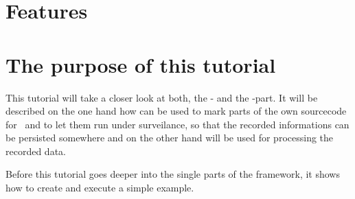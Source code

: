 \section{Features}
	
\section{The purpose of this tutorial}
This tutorial will take a closer look at both, the \KiekerMonitoringPart - and the \KiekerAnalysisPart-part. It will be described on the one hand how \KiekerMonitoringPart  can be used to mark parts of the own sourcecode for \Kieker\  and to let them run under surveilance, so that the recorded informations can be persisted somewhere and on the other hand \KiekerAnalysisPart will be used for processing the recorded data.

Before this tutorial goes deeper into the single parts of the framework, it shows how to create and execute a simple example.
